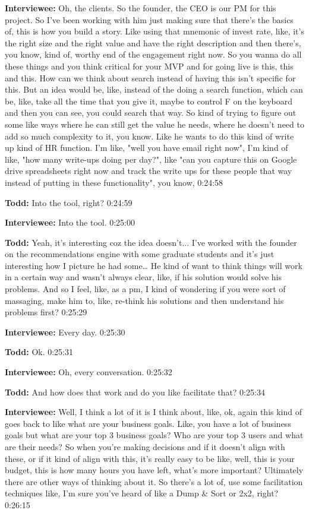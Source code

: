 \textbf{Interviewee:} Oh, the clients.  So the founder, the CEO is our PM for this project.  So I've been working with him just making sure that there's the basics of, this is how you build a story.  Like using that mnemonic of invest rate, like, it's the right size and the right value and have the right description and then there's, you know, kind of, worthy end of the engagement right now.  So you wanna do all these things and you think critical for your MVP and for going live is this, this and this. How can we think about search instead of having this isn't specific for this.  But an idea would be, like, instead of the doing a search function, which can be, like, take all the time that you give it, maybe to control F on the keyboard and then you can see, you could search that way.   So kind of trying to figure out some like ways where he can still get the value he needs, where he doesn't need to add so much complexity to it, you know.  Like he wants to do this kind of write up kind of HR function. I'm like, "well you have email right now", I'm kind of like, "how many write-ups doing per day?", like "can you capture this on Google drive spreadsheets right now and track the write ups for these people that way instead of putting in these functionality", you know,  0:24:58

\textbf{Todd:} Into the tool, right?   0:24:59

\textbf{Interviewee:} Into the tool.   0:25:00

\textbf{Todd:} Yeah, it's interesting coz the idea doesn't... I've worked with the founder on the recommendations engine with some graduate students and it's just interesting how I picture he had some…  He kind of want to think things will work in a certain way and wasn't always clear, like, if his solution would solve his problems.  And so I feel, like, as a pm, I kind of wondering if you were sort of massaging, make him to, like, re-think his solutions and then understand his problems first?   0:25:29

\textbf{Interviewee:} Every day.   0:25:30

\textbf{Todd:} Ok.   0:25:31

\textbf{Interviewee:} Oh, every conversation.   0:25:32

\textbf{Todd:} And how does that work and do you like facilitate that?   0:25:34

\textbf{Interviewee:} Well, I think a lot of it is I think about, like, ok, again this kind of goes back to like what are your business goals.  Like, you have a lot of business goals but what are your top 3 business goals? Who are your top 3 users and what are their needs?  So when you're making decisions and if it doesn't align with these, or if it kind of align with this, it's really easy to be like, well, this is your budget, this is how many hours you have left, what's more important?  Ultimately there are other ways of thinking about it. So there's a lot of, use some facilitation techniques like, I'm sure you've heard of like a Dump \& Sort or 2x2, right?   0:26:15

